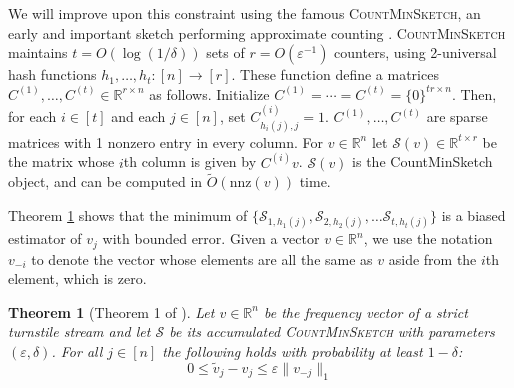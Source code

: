 \documentclass{report}
\newtheorem{theorem}{Theorem}[section]
\newcommand{\algoname}[1]{\textnormal{\textsc{#1}}}
\newcommand{\nnz}{\mathrm{nnz}}
\begin{document}
We will improve upon this constraint using the famous \algoname{CountMinSketch}, an early and important sketch performing approximate counting \cite{cormode2005improved}. 
\algoname{CountMinSketch} maintains 
$t = O(\log (1/\delta))$ sets of 
$r = O(\varepsilon^{-1})$ counters, using 2-universal hash functions $h_1, \dots, h_t: [n] \rightarrow [r]$.
These function define a matrices $C^{(1)}, \dots, C^{(t)} \in \mathbb{R}^{r \times n}$ as follows.
Initialize $C^{(1)} = \cdots = C^{(t)} = \{0\}^{tr \times n}$.
Then, for each $i \in [t]$ and each $j \in [n]$, set $C^{(i)}_{h_i(j),j} = 1$. 
$C^{(1)}, \dots, C^{(t)}$ are sparse matrices with 1 nonzero entry in every column. 
For $v \in \mathbb{R}^n$ let $\mathcal{S}(v) \in \mathbb{R}^{t \times r}$ be the matrix whose $i$th column is given by $C^{(i)}v$.
$\mathcal{S}(v)$ is the CountMinSketch object, and can be computed in $\widetilde{O}(\nnz(v))$ time. 

Theorem \ref{thm:cms:err} shows that the minimum of $\{\mathcal{S}_{1,h_1(j)}, \mathcal{S}_{2,h_2(j)}, \dots \mathcal{S}_{t,h_t(j)}\}$ is a biased estimator of $v_j$ with bounded error.
Given a vector $v \in \mathbb{R}^n$, we use the notation $v_{-i}$ to denote the vector whose elements are all the same as $v$ aside from the $i$th element, which is zero.
%
\begin{theorem}[Theorem 1 of \cite{cormode2005improved}] \label{thm:cms:err}
Let $v \in \mathbb{R}^n$ be the frequency vector of a strict turnstile stream and let $\mathcal{S}$ be its accumulated \algoname{CountMinSketch} with parameters $(\varepsilon, \delta)$.
For all $j \in [n]$ the following holds with probability at least $1-\delta$:
%
\begin{equation*}
0 \leq \widetilde{v}_j - v_j \leq \varepsilon \|v_{-j}\|_1
\end{equation*}
%
\end{theorem}
%
\end{document}

